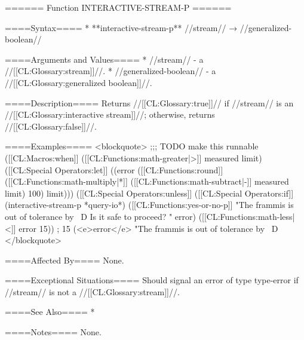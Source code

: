 ====== Function INTERACTIVE-STREAM-P ======

====Syntax====
  * **interactive-stream-p** //stream// → //generalized-boolean//

====Arguments and Values====
  * //stream// - a //[[CL:Glossary:stream]]//.
  * //generalized-boolean// - a //[[CL:Glossary:generalized boolean]]//.

====Description====
Returns //[[CL:Glossary:true]]// if //stream// is an //[[CL:Glossary:interactive stream]]//; otherwise, returns //[[CL:Glossary:false]]//.

====Examples====
<blockquote>
;;; TODO make this runnable
([[CL:Macros:when]] ([[CL:Functions:math-greater|>]] measured limit) 
  ([[CL:Special Operators:let]] ((error ([[CL:Functions:round]] ([[CL:Functions:math-multiply|*]] ([[CL:Functions:math-subtract|-]] measured limit) 100) limit)))
    ([[CL:Special Operators:unless]] ([[CL:Special Operators:if]] (interactive-stream-p *query-io*) 
                ([[CL:Functions:yes-or-no-p]] "The frammis is out of tolerance by ~D%
                              Is it safe to proceed? " error)
                ([[CL:Functions:math-less|<]] error 15)) ; 15%
      (<e>error</e> "The frammis is out of tolerance by ~D%
</blockquote>

====Affected By====
None.

====Exceptional Situations====
Should signal an error of type type-error if //stream// is not a //[[CL:Glossary:stream]]//.

====See Also====
  * {\secref\StreamConcepts}

====Notes====
None.

